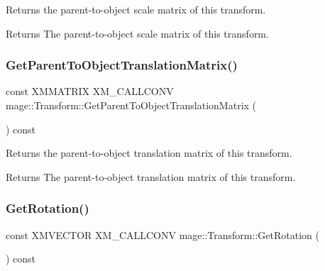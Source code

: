 Returns the parent-\/to-\/object scale matrix of this transform.

\begin{DoxyReturn}{Returns}
The parent-\/to-\/object scale matrix of this transform. 
\end{DoxyReturn}
\mbox{\label{classmage_1_1_transform_af59262c0537f9ecb6ab9af0b6dbc70d2}} 
\subsubsection{\texorpdfstring{Get\+Parent\+To\+Object\+Translation\+Matrix()}{GetParentToObjectTranslationMatrix()}}
{\footnotesize\ttfamily const X\+M\+M\+A\+T\+R\+IX X\+M\+\_\+\+C\+A\+L\+L\+C\+O\+NV mage\+::\+Transform\+::\+Get\+Parent\+To\+Object\+Translation\+Matrix (\begin{DoxyParamCaption}{ }\end{DoxyParamCaption}) const\hspace{0.3cm}{\ttfamily [noexcept]}}

Returns the parent-\/to-\/object translation matrix of this transform.

\begin{DoxyReturn}{Returns}
The parent-\/to-\/object translation matrix of this transform. 
\end{DoxyReturn}
\mbox{\label{classmage_1_1_transform_a68da6687db138d4351dbb4859afad477}} 
\subsubsection{\texorpdfstring{Get\+Rotation()}{GetRotation()}}
{\footnotesize\ttfamily const X\+M\+V\+E\+C\+T\+OR X\+M\+\_\+\+C\+A\+L\+L\+C\+O\+NV mage\+::\+Transform\+::\+Get\+Rotation (\begin{DoxyParamCaption}{ }\end{DoxyParamCaption}) const\hspace{0.3cm}{\ttfamily [noexcept]}}

